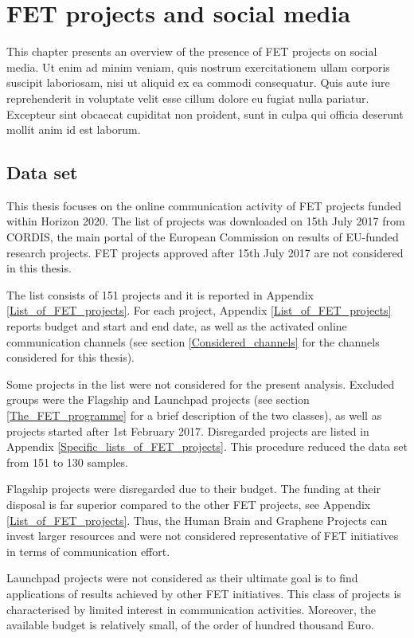\chapter{FET projects and social media}
This chapter presents an overview of the presence of FET projects on social media. Ut enim ad minim veniam, quis nostrum exercitationem ullam corporis suscipit laboriosam, nisi ut aliquid ex ea commodi consequatur. Quis aute iure reprehenderit in voluptate velit esse cillum dolore eu fugiat nulla pariatur. Excepteur sint obcaecat cupiditat non proident, sunt in culpa qui officia deserunt mollit anim id est laborum.

\section{Data set} \label{Data_set}
This thesis focuses on the online communication activity of FET projects funded within Horizon 2020. The list of projects was downloaded on 15th July 2017 from CORDIS, the main portal of the European Commission on results of EU-funded research projects\cite{CORDIS}. FET projects approved after 15th July 2017 are not considered in this thesis.

The list consists of 151 projects and it is reported in Appendix \ref{List_of_FET_projects}. For each project, Appendix \ref{List_of_FET_projects} reports budget and start and end date, as well as the activated online communication channels (see section \ref{Considered_channels} for the channels considered for this thesis).   

Some projects in the list were not considered for the present analysis. Excluded groups were the Flagship and Launchpad projects (see section \ref{The_FET_programme} for a brief description of the two classes), as well as projects started after 1st February 2017. Disregarded projects are listed in Appendix \ref{Specific_lists_of_FET_projects}. This procedure reduced the data set from 151 to 130 samples.

Flagship projects were disregarded due to their budget. The funding at their disposal is far superior compared to the other FET projects, see Appendix \ref{List_of_FET_projects}. Thus, the Human Brain and Graphene Projects can invest larger resources and were not considered representative of FET initiatives in terms of communication effort. 

Launchpad projects were not considered as their ultimate goal is to find applications of results achieved by other FET initiatives. This class of projects is characterised by limited interest in communication activities. Moreover, the available budget is relatively small, of the order of hundred thousand Euro. 

